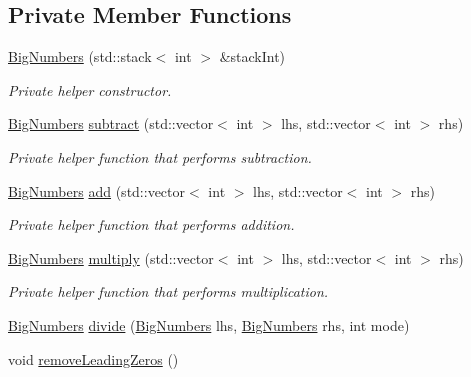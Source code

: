 \subsection*{Private Member Functions}
\begin{DoxyCompactItemize}
\item 
\mbox{\label{class_big_numbers_a5bd81464d46ff6fa0e80aa64093af1ff}} 
\mbox{\hyperlink{class_big_numbers_a5bd81464d46ff6fa0e80aa64093af1ff}{Big\+Numbers}} (std\+::stack$<$ int $>$ \&stack\+Int)
\begin{DoxyCompactList}\small\item\em Private helper constructor. \end{DoxyCompactList}\item 
\mbox{\label{class_big_numbers_a9109b7a17b66089315a27649ef20a8e0}} 
\mbox{\hyperlink{class_big_numbers}{Big\+Numbers}} \mbox{\hyperlink{class_big_numbers_a9109b7a17b66089315a27649ef20a8e0}{subtract}} (std\+::vector$<$ int $>$ lhs, std\+::vector$<$ int $>$ rhs)
\begin{DoxyCompactList}\small\item\em Private helper function that performs subtraction. \end{DoxyCompactList}\item 
\mbox{\label{class_big_numbers_ad5145c30bda0b24e585fbfcf1e24e058}} 
\mbox{\hyperlink{class_big_numbers}{Big\+Numbers}} \mbox{\hyperlink{class_big_numbers_ad5145c30bda0b24e585fbfcf1e24e058}{add}} (std\+::vector$<$ int $>$ lhs, std\+::vector$<$ int $>$ rhs)
\begin{DoxyCompactList}\small\item\em Private helper function that performs addition. \end{DoxyCompactList}\item 
\mbox{\label{class_big_numbers_aaa4248b6478e04df5765c1c3d8587cc5}} 
\mbox{\hyperlink{class_big_numbers}{Big\+Numbers}} \mbox{\hyperlink{class_big_numbers_aaa4248b6478e04df5765c1c3d8587cc5}{multiply}} (std\+::vector$<$ int $>$ lhs, std\+::vector$<$ int $>$ rhs)
\begin{DoxyCompactList}\small\item\em Private helper function that performs multiplication. \end{DoxyCompactList}\item 
\mbox{\hyperlink{class_big_numbers}{Big\+Numbers}} \mbox{\hyperlink{class_big_numbers_a72014485e13fae1c0711f4fd6628392a}{divide}} (\mbox{\hyperlink{class_big_numbers}{Big\+Numbers}} lhs, \mbox{\hyperlink{class_big_numbers}{Big\+Numbers}} rhs, int mode)
\item 
void \mbox{\hyperlink{class_big_numbers_a70e286c61489246cdfc307c2849aaaf2}{remove\+Leading\+Zeros}} ()
\end{DoxyCompactItemize}
